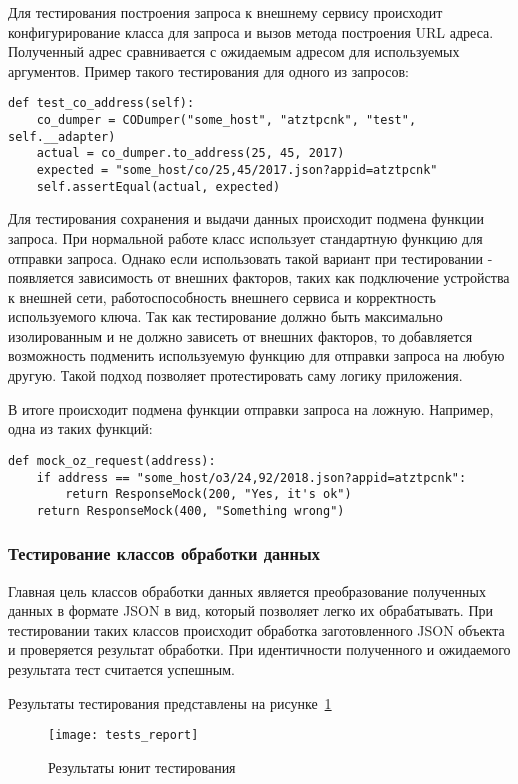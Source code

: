 Для тестирования построения запроса к внешнему сервису происходит конфигурирование класса для запроса и вызов метода построения URL адреса.
Полученный адрес сравнивается с ожидаемым адресом для используемых аргументов.
Пример такого тестирования для одного из запросов:

\begin{lstlisting}
def test_co_address(self):
    co_dumper = CODumper("some_host", "atztpcnk", "test", self.__adapter)
    actual = co_dumper.to_address(25, 45, 2017)
    expected = "some_host/co/25,45/2017.json?appid=atztpcnk"
    self.assertEqual(actual, expected)
\end{lstlisting}

Для тестирования сохранения и выдачи данных происходит подмена функции запроса.
При нормальной работе класс использует стандартную функцию для отправки запроса.
Однако если использовать такой вариант при тестировании - появляется зависимость от внешних факторов, таких как подключение устройства к внешней сети, работоспособность внешнего сервиса и корректность используемого ключа.
Так как тестирование должно быть максимально изолированным и не должно зависеть от внешних факторов, то добавляется возможность подменить используемую функцию для отправки запроса на любую другую.
Такой подход позволяет протестировать саму логику приложения.

В итоге происходит подмена функции отправки запроса на ложную.
Например, одна из таких функций:
\begin{lstlisting}
def mock_oz_request(address):
    if address == "some_host/o3/24,92/2018.json?appid=atztpcnk":
        return ResponseMock(200, "Yes, it's ok")
    return ResponseMock(400, "Something wrong")
\end{lstlisting}

\subsubsection{Тестирование классов обработки данных}

Главная цель классов обработки данных является преобразование полученных данных в формате JSON в вид, который позволяет легко их обрабатывать.
При тестировании таких классов происходит обработка заготовленного JSON объекта и проверяется результат обработки.
При идентичности полученного и ожидаемого результата тест считается успешным.

Результаты тестирования представлены на рисунке~\ref{pic:lit_testing:tests_report}

\begin{figure}
    \centering
    \texttt{[image: tests\_report]}
    \caption{Результаты юнит тестирования}
    \label{pic:lit_testing:tests_report}
\end{figure}

